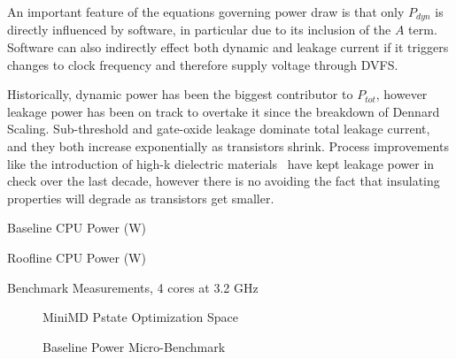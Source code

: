An important feature of the equations governing power draw is that only $P_{dyn}$ is directly influenced by software, in particular due to its inclusion of the $A$ term. Software can also indirectly effect both dynamic and leakage current if it triggers changes to clock frequency and therefore supply voltage through DVFS.  

Historically, dynamic power has been the biggest contributor to $P_{tot}$, however leakage power has been on track to overtake it since the breakdown of Dennard Scaling.  Sub-threshold and gate-oxide leakage dominate total leakage current, and they both increase exponentially as transistors shrink. Process improvements like the introduction of high-k dielectric materials~\cite{jan:2009aa} have kept leakage power in check over the last decade, however there is no avoiding the fact that insulating properties will degrade as transistors get smaller.


\begin{table}
\centering

\caption{Baseline CPU Power (W)}
\end{table} 


\begin{table}
\centering

\caption{Roofline CPU Power (W)}
\end{table} 



\begin{table}
\centering

\caption{Benchmark Measurements, 4 cores at 3.2 GHz}
\end{table} 


\begin{figure}
\centering

\caption{MiniMD Pstate Optimization Space}
\label{fig:minimd-pstates}
\end{figure}


\begin{figure}[ht]                                                               
\centering                                                                      
\lstset{basicstyle=\ttfamily\footnotesize\bfseries, frame=tb} %
              
\caption{Baseline Power Micro-Benchmark}                            
\label{fig:microbench}                                                           
\end{figure}  


